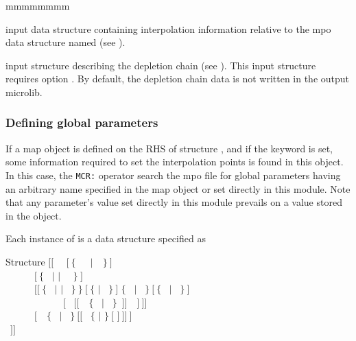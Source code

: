 \begin{ListeDeDescription}{mmmmmmmm}
\item[\dusa{MCRdescints}] input data structure containing interpolation information relative to the {\sc mpo} data structure named  (see ).

\item[\dstr{descdepl}] input structure describing the depletion chain (see ). This input structure requires option . By
default, the depletion chain data is not written in the output {\sc microlib}.

\end{ListeDeDescription}

\subsubsection{Defining global parameters}\label{sect:MCRdescints}

\vskip -0.5cm

If a {\sc map} object is defined on the RHS of structure , and if the  keyword is set, some information required to set the interpolation points is found in this object.
In this case, the {\tt MCR:} operator search the {\sc mpo} file for global parameters  having an arbitrary name specified in the {\sc map} object or set directly in this module.
Note that any parameter's value set directly in this module prevails on a value stored in the  object.

Each instance of  is a data structure specified as

\begin{DataStructure}{Structure }
$[[$~ ~$[~\{$~~~$|$~~$\}~]$ \\
~~~~~~$[~\{$~ $|$  $|$ ~~$\}~]$ \\
~~~~~~$[[~\{$~ $|$  $|$ ~$\}~\}~[~\{$  $|$ ~$\}~]$  $\{$~ $|$ ~$\}~[~\{$~ $|$ ~$\}~]$ \\
~~~~~~~~~~~~$[$~ $[[$~~$\{$~ $|$ ~$\}$~$]]$~~$]~]]$  \\
~~~~~~$[$~~$\{$~ $|$ ~$\}~[[$~ $\{$  $|$ \moc{*} $\}~[$  $]~]]~]$ \\
~$]]$
\end{DataStructure}

